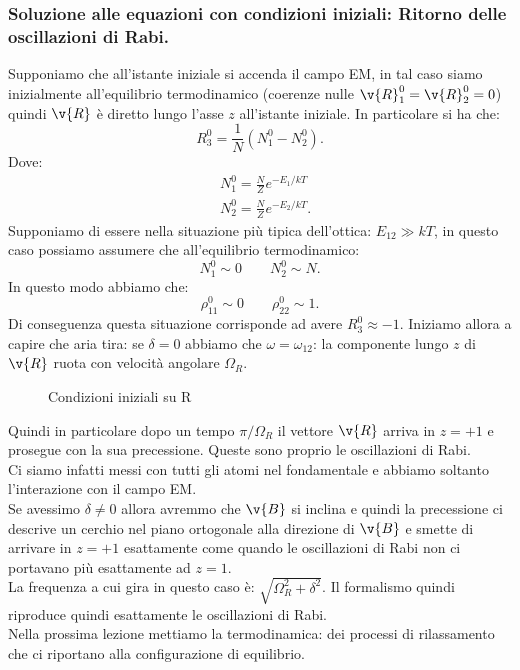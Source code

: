 \subsubsection{Soluzione alle equazioni con condizioni iniziali: Ritorno delle oscillazioni di Rabi.}%
Supponiamo che all'istante iniziale si accenda il campo EM, in tal caso siamo inizialmente all'equilibrio termodinamico (coerenze nulle $\v{R}_1^0 = \v{R}_2^0=0$) quindi $\v{R}$ è diretto lungo l'asse $z$ all'istante iniziale.
In particolare si ha che:
\[
    R_3^0 = \frac{1}{N}\left(N_1^0 -N_2^0\right)
.\] 
Dove:
\[\begin{aligned}
    &N_1^0 = \frac{N}{Z}e^{-E_1 /kT}\\
    &N_2^0 = \frac{N}{Z}e^{-E_2 /kT}
.\end{aligned}\]
Supponiamo di essere nella situazione più tipica dell'ottica: $E_{12}\gg kT$, in questo caso possiamo assumere che all'equilibrio termodinamico:
\[
N_1^0\sim 0\qquad
N_2^0 \sim N
.\] 
In questo modo abbiamo che:
\[
    \rho_{11}^0\sim 0\qquad
    \rho_{22}^0\sim 1
.\] 
Di conseguenza questa situazione corrisponde ad avere $R_3^0\approx-1$.
Iniziamo allora a capire che aria tira: se $\delta =0$ abbiamo che $\omega = \omega_{12}$: la componente lungo $z$ di $\v{R}$ ruota con velocità angolare $\Omega_R$. 
\begin{figure}[H]
    \centering
    \caption{Condizioni iniziali su R}
    \label{fig:condizioni-iniziali-su-r}
\end{figure}
\noindent
Quindi in particolare dopo un tempo $\pi /\Omega_R$  il vettore $\v{R}$ arriva in $z=+1$ e prosegue con la sua precessione. Queste sono proprio le oscillazioni di Rabi.\\
Ci siamo infatti messi con tutti gli atomi nel fondamentale e abbiamo soltanto l'interazione con il campo EM.\\
Se avessimo $\delta\neq 0$ allora avremmo che $\v{B}$ si inclina e quindi la precessione ci descrive un cerchio nel piano ortogonale alla direzione di $\v{B}$ e smette di arrivare in $z=+1$ esattamente come quando le oscillazioni di Rabi non ci portavano più esattamente ad $z=1$.\\
La frequenza a cui gira in questo caso è: $\sqrt{\Omega_R^2+\delta^2}$. Il formalismo quindi riproduce quindi esattamente le oscillazioni di Rabi.\\
Nella prossima lezione mettiamo la termodinamica: dei processi di rilassamento che ci riportano alla configurazione di equilibrio.

